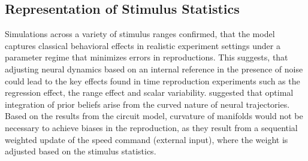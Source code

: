 \documentclass[10pt]{article}
\begin{document}
\subsection{Representation of Stimulus Statistics}
Simulations across a variety of stimulus ranges confirmed, that the model captures classical behavioral effects in realistic experiment settings under a parameter regime that minimizes errors in reproductions. %
This suggests, that adjusting neural dynamics based on an internal reference in the presence of noise could lead to the key effects found in time reproduction experiments such as the regression effect, the range effect and scalar variability. 
\cite{Sohn2019} suggested that optimal integration of prior beliefs arise from the curved nature of neural trajectories. Based on the results from the circuit model, curvature of manifolds would not be necessary to achieve biases in the reproduction, as they result from a sequential weighted update of the speed command (external input), where the weight is adjusted based on the stimulus statistics. 
\end{document}
